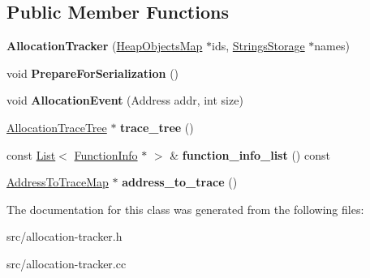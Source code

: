 \subsection*{Public Member Functions}
\begin{DoxyCompactItemize}
\item 
\hypertarget{classv8_1_1internal_1_1_allocation_tracker_ae705bae00ff323c41efc0b1d50afc62c}{}{\bfseries Allocation\+Tracker} (\hyperlink{classv8_1_1internal_1_1_heap_objects_map}{Heap\+Objects\+Map} $\ast$ids, \hyperlink{classv8_1_1internal_1_1_strings_storage}{Strings\+Storage} $\ast$names)\label{classv8_1_1internal_1_1_allocation_tracker_ae705bae00ff323c41efc0b1d50afc62c}

\item 
\hypertarget{classv8_1_1internal_1_1_allocation_tracker_a06984664822efec67f15cfc200f9c1c8}{}void {\bfseries Prepare\+For\+Serialization} ()\label{classv8_1_1internal_1_1_allocation_tracker_a06984664822efec67f15cfc200f9c1c8}

\item 
\hypertarget{classv8_1_1internal_1_1_allocation_tracker_af59e0f4c414b6fe00ff0729e616ae219}{}void {\bfseries Allocation\+Event} (Address addr, int size)\label{classv8_1_1internal_1_1_allocation_tracker_af59e0f4c414b6fe00ff0729e616ae219}

\item 
\hypertarget{classv8_1_1internal_1_1_allocation_tracker_aa0471186f074acec90232839b6e22431}{}\hyperlink{classv8_1_1internal_1_1_allocation_trace_tree}{Allocation\+Trace\+Tree} $\ast$ {\bfseries trace\+\_\+tree} ()\label{classv8_1_1internal_1_1_allocation_tracker_aa0471186f074acec90232839b6e22431}

\item 
\hypertarget{classv8_1_1internal_1_1_allocation_tracker_a25d10af2d1bde8601599623c34754b2e}{}const \hyperlink{classv8_1_1internal_1_1_list}{List}$<$ \hyperlink{structv8_1_1internal_1_1_allocation_tracker_1_1_function_info}{Function\+Info} $\ast$ $>$ \& {\bfseries function\+\_\+info\+\_\+list} () const \label{classv8_1_1internal_1_1_allocation_tracker_a25d10af2d1bde8601599623c34754b2e}

\item 
\hypertarget{classv8_1_1internal_1_1_allocation_tracker_adacf25ec6310501fb4d9ae02c1737621}{}\hyperlink{classv8_1_1internal_1_1_address_to_trace_map}{Address\+To\+Trace\+Map} $\ast$ {\bfseries address\+\_\+to\+\_\+trace} ()\label{classv8_1_1internal_1_1_allocation_tracker_adacf25ec6310501fb4d9ae02c1737621}

\end{DoxyCompactItemize}


The documentation for this class was generated from the following files\+:\begin{DoxyCompactItemize}
\item 
src/allocation-\/tracker.\+h\item 
src/allocation-\/tracker.\+cc\end{DoxyCompactItemize}
